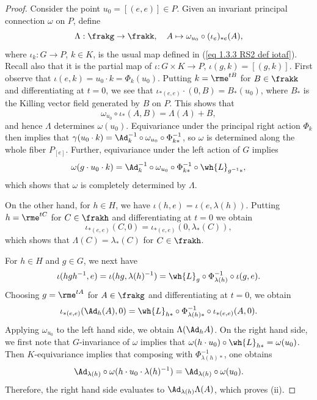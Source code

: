 \begin{proof}
    Consider the point $u_0=[(e,e)]\in P$. Given an invariant principal connection $\omega$ on $P$, define 
    \[\Lambda:\frakg\to \frakk,\quad A\mapsto \omega_{u_0}\circ (\iota_e)_{\ast e}(A),\]
    where $\iota_k:G\to P$, $k\in K$, is the usual map defined in (\ref{eq 1.3.3 RS2 def iotaf}). Recall also that it is the partial map of $\iota:G\times K\to P$, $\iota(g,k)=[(g,k)]$. First observe that $\iota(e,k)=u_0\cdot k=\Phi_k(u_0)$. Putting $k=\rme^{tB}$ for $B\in\frakk$ and differentiating at $t=0$, we see that $\iota_{\ast(e,e)}\cdot (0,B)=B_{\ast}(u_0)$, where $B_\ast$ is the Killing vector field generated by $B$ on $P$.  This shows that 
    \[\omega_{u_0}\circ \iota_\ast(A,B)=\Lambda(A)+B,\label{4797}\] 
    and hence $\Lambda$ determines $\omega(u_0)$. Equivariance under the principal right action $\Phi_k$ then implies that $\gamma(u_0\cdot k)=\Ad_k^{-1}\circ \omega_{u_0}\circ \Phi_{k\ast}^{-1}$, so $\omega$ is determined along the whole fiber $P_{[e]}$. Further, equivariance under the left action of $G$ implies 
    \[\omega(g\cdot u_0\cdot k)=\Ad_k^{-1}\circ \omega_{u_0}\circ \Phi_{k\ast}^{-1}\circ \wh{L}_{g^{-1}\ast},\label{eq 1.10 Cap}\]
    which shows that $\omega$ is completely determined by $\Lambda$.

    On the other hand, for $h\in H$, we have $\iota(h,e)=\iota(e,\lambda(h))$. Putting $h=\rme^{tC}$ for $C\in\frakh$ and differentiating at $t=0$ we obtain 
    \[\iota_{\ast(e,e)}(C,0)=\iota_{\ast(e,e)}(0,\lambda_\ast(C)),\]
    which shows that $\Lambda(C)=\lambda_\ast(C)$ for $C\in\frakh$.

    For $h\in H$ and $g\in G$, we next have 
    \[\iota(hgh^{-1},e)=\iota(hg,\lambda(h)^{-1})=\wh{L}_g\circ \Phi_{\lambda(h)}^{-1}\circ \iota(g,e).\]
    Choosing $g=\rme^{tA}$ for $A\in\frakg$ and differentiating at $t=0$, we obtain 
    \[\iota_{\ast(e,e)}(\Ad_h(A),0)=\wh{L}_{h\ast}\circ \Phi_{\lambda(h)\ast}^{-1}\circ \iota_{\ast(e,e)}(A,0).\]
    Applying $\omega_{u_0}$ to the left hand side, we obtain $\Lambda(\Ad_h A)$. On the right hand side, we first note that $G$-invariance of $\omega$ implies that $\omega(h\cdot u_0)\circ \wh{L}_{h\ast}=\omega(u_0)$. Then $K$-equivariance implies that composing with $\Phi_{\lambda(h)\ast}^{-1}$, one obtains 
    \[\Ad_{\lambda(h)}\circ \omega(h\cdot u_0\cdot \lambda(h)^{-1})=\Ad_{\lambda(h)}\circ \omega(u_0).\]
    Therefore, the right hand side evaluates to $\Ad_{\lambda(h)}\Lambda(A)$, which proves (ii).


\end{proof}
